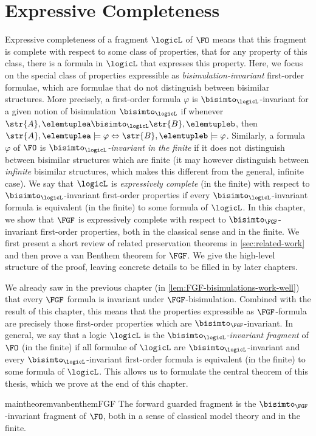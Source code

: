 \chapter{Expressive Completeness}\label{chap:expressivity}
Expressive completeness of a fragment $\logicL$ of $\FO$ means that this fragment is complete with respect to some class of properties, \ie{} that for any property of this class, there is a formula in $\logicL$ that expresses this property.
Here, we focus on the special class of properties expressible as \emph{bisimulation-invariant} first-order formulae, which are formulae that do not distinguish between bisimilar structures.
More precisely, a first-order formula $\varphi$ is $\bisimto_{\logicL}$-invariant for a given notion of bisimulation $\bisimto_{\logicL}$ if whenever $\str{A}, \elemtuplea \bisimto_{\logicL} \str{B}, \elemtupleb$, then $\str{A}, \elemtuplea \models \varphi \Leftrightarrow \str{B}, \elemtupleb \models \varphi$.
Similarly, a formula $\varphi$ of $\FO$ is \emph{$\bisimto_{\logicL}$-invariant in the finite} if it does not distinguish between bisimilar structures which are finite (it may however distinguish between \emph{infinite} bisimilar structures, which makes this different from the general, infinite case).
We say that $\logicL$ is \emph{expressively complete} (in the finite) with respect to $\bisimto_{\logicL}$-invariant first-order properties if every $\bisimto_{\logicL}$-invariant formula is equivalent (in the finite) to some formula of $\logicL$.
In this chapter, we show that $\FGF$ is expressively complete with respect to $\bisimto_{\FGF}$-invariant first-order properties, both in the classical sense and in the finite.
We first present a short review of related preservation theorems in \cref{sec:related-work} and then prove a van Benthem theorem for $\FGF$.
We give the high-level structure of the proof, leaving concrete details to be filled in by later chapters.

We already saw in the previous chapter (in \cref{lem:FGF-bisimulations-work-well}) that every $\FGF$ formula is invariant under $\FGF$-bisimulation.
Combined with the result of this chapter, this means that the properties expressible as $\FGF$-formula are precisely those first-order properties which are $\bisimto_{\FGF}$-invariant.
In general, we say that a logic $\logicL$ is the \emph{$\bisimto_{\logicL}$-invariant fragment} of $\FO$ (in the finite) if all formulae of $\logicL$ are $\bisimto_{\logicL}$-invariant and every $\bisimto_{\logicL}$-invariant first-order formula is equivalent (in the finite) to some formula of $\logicL$.
This allows us to formulate the central theorem of this thesis, which we prove at the end of this chapter.
\begin{restatable*}{maintheorem}{vanbenthemFGF}\label{thm:main}
The forward guarded fragment is the $\bisimto_{\FGF}$-invariant fragment of $\FO$, both in a sense of classical model theory and in the finite.
\end{restatable*}

